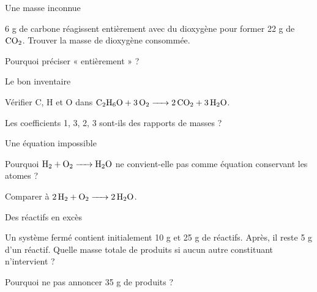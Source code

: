 \par\noindent\begin{minipage}{\linewidth}
\begin{exercice}[2]{Une masse inconnue}
\begin{questions}
\item 6 g de carbone réagissent entièrement avec du dioxygène pour former 22 g de $\ce{CO2}$. Trouver la masse de dioxygène consommée.
\item Pourquoi préciser « entièrement » ?
\end{questions}
\end{exercice}
\end{minipage}
\par\noindent\begin{minipage}{\linewidth}
\begin{exercice}[2]{Le bon inventaire}
\begin{questions}
\item Vérifier C, H et O dans $\ce{C2H6O + 3 O2 -> 2 CO2 + 3 H2O}$.
\item Les coefficients 1, 3, 2, 3 sont-ils des rapports de masses ?
\end{questions}
\end{exercice}
\end{minipage}
\par\noindent\begin{minipage}{\linewidth}
\begin{exercice}[2]{Une équation impossible}
\begin{questions}
\item Pourquoi $\ce{H2 + O2 -> H2O}$ ne convient-elle pas comme équation conservant les atomes ?
\item Comparer à $\ce{2 H2 + O2 -> 2 H2O}$.
\end{questions}
\end{exercice}
\end{minipage}
\par\noindent\begin{minipage}{\linewidth}
\begin{exercice}[2]{Des réactifs en excès}
\begin{questions}
\item Un système fermé contient initialement 10 g et 25 g de réactifs. Après, il reste 5 g d’un réactif. Quelle masse totale de produits si aucun autre constituant n’intervient ?
\item Pourquoi ne pas annoncer 35 g de produits ?
\end{questions}
\end{exercice}
\end{minipage}

